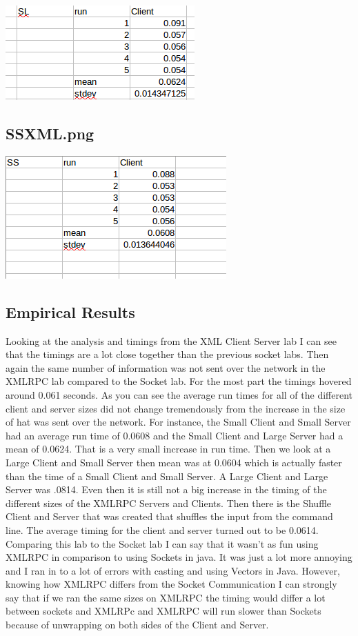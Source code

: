 \documentclass{article}
\begin{document}
\includegraphics[scale=1.0]{SLXML.png}

\subsection{SSXML.png}

\includegraphics[scale=1.0]{SSXML.png}

\subsection{Empirical Results}
Looking at the analysis and timings from the XML Client Server lab I can see that the timings are a lot close together than the previous socket labs. Then again the same number of information was not sent over the network in the XMLRPC lab compared to the Socket lab. For the most part the timings hovered around 0.061 seconds. As you can see the average run times for all of the different client and server sizes did not change tremendously from the increase in the size of hat was sent over the network. For instance, the Small Client and Small Server  had an average run time of 0.0608 and the Small Client and Large Server had a mean of 0.0624. That is a very small increase in run time. Then we look at a Large Client and Small Server then mean was at 0.0604 which is actually faster than the time of a Small Client and Small Server. A Large Client and Large Server was .0814. Even then it is still not a big increase in the timing of the different sizes of the XMLRPC Servers and Clients. Then there is the Shuffle Client and Server that was created that shuffles the input from the command line. The average timing for the client and server turned out to be 0.0614. Comparing this lab to the Socket lab I can say that it wasn't as fun using XMLRPC in comparison to using Sockets in java. It was just a lot more annoying and I ran in to a lot of errors with casting and using Vectors in Java. However, knowing how XMLRPC differs from the Socket Communication I can strongly say that if we ran the same sizes on XMLRPC the timing would differ a lot between sockets and XMLRPc and XMLRPC will run slower than Sockets because of unwrapping on both sides of the Client and Server.
\end{document}
